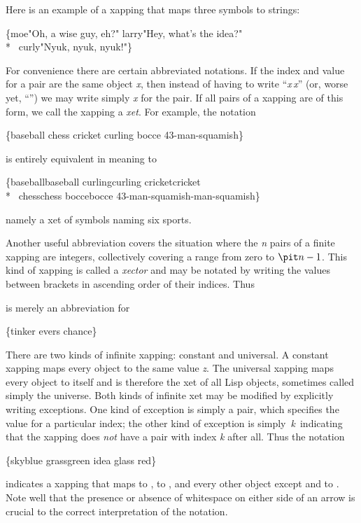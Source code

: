 \begin{defun}[Function]
\begin{new}
Here is an example of a xapping that maps three symbols to strings:
\begin{lisp}
\{moe\Xarrowright "Oh, a wise guy, eh?" larry\Xarrowright "Hey, what's the idea?" \\*
 ~curly\Xarrowright "Nyuk, nyuk, nyuk!"\}
\end{lisp}
For convenience there are certain abbreviated notations.
If the index and value for a pair are the same object {\it x},
then instead of having to write ``{\it x}\Xarrowright\,{\it x}''
(or, worse yet, ``'')
we may write simply {\it x} for the pair.
If all pairs of a xapping are of this form, we call the xapping a {\it xet}.
For example, the notation
\begin{lisp}
\{baseball chess cricket curling bocce 43-man-squamish\}
\end{lisp}
is entirely equivalent in meaning to
\begin{lisp}
\{baseball\Xarrowright baseball curling\Xarrowright curling cricket\Xarrowright cricket \\*
~chess\Xarrowright chess bocce\Xarrowright bocce 43-man-squamish-man-squamish\}
\end{lisp}
namely a xet of symbols naming six sports.

Another useful abbreviation covers the situation where the {\it n} pairs of a finite
xapping are integers, collectively covering a range from zero to ${\it n}-1$.
This kind of xapping is called a {\it xector} and may be notated by writing
the values between brackets in ascending order of their indices.
Thus
\begin{lisp}
\end{lisp}
is merely an abbreviation for
\begin{lisp}
\{tinker evers chance\}
\end{lisp}

There are two kinds of infinite xapping: constant and universal.
A constant xapping  maps every object to the same value {\it z}.
The universal xapping \cd{\{\Xarrowright\}} maps every object to itself and is therefore the xet
of all Lisp objects, sometimes called simply the universe.
Both kinds of infinite xet may be modified by explicitly writing exceptions.
One kind of exception is simply a pair, which specifies the value for a particular index;
the other kind of exception is simply \,{\it k}\Xarrowright\, indicating that the xapping does
{\it not} have a pair with index {\it k} after all.  Thus the notation
\begin{lisp}
\{sky\Xarrowright blue grass\Xarrowright green idea\Xarrowright{} glass\Xarrowright{} \Xarrowright red\}
\end{lisp}
indicates a xapping that maps  to ,  to ,
and every other object except  and  to .
Note well that the presence or absence of whitespace on either side
of an arrow is crucial to the correct interpretation
of the notation.


\end{new}
\end{defun}
